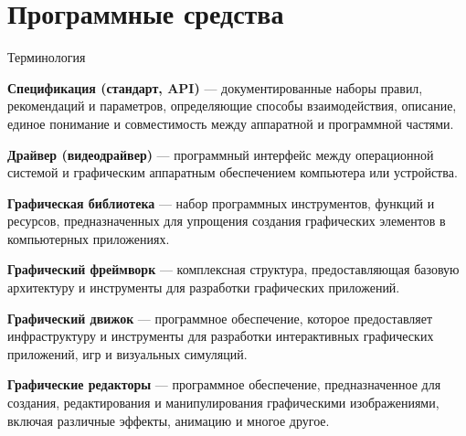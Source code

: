 \documentclass{beamer}
\begin{document}
\section{Программные средства}
\begin{frame}{Терминология}
	{\scriptsize

		\textbf{Спецификация (стандарт, API)} --- документированные наборы правил, рекомендаций и параметров, определяющие способы взаимодействия, описание, единое понимание и совместимость между аппаратной и программной частями.

		\textbf{Драйвер (видеодрайвер)} --- программный интерфейс между операционной системой и графическим аппаратным обеспечением компьютера или устройства.

		\textbf{Графическая библиотека} --- набор программных инструментов, функций и ресурсов, предназначенных для упрощения создания графических элементов в компьютерных приложениях.

		\textbf{Графический фреймворк} --- комплексная структура, предоставляющая базовую архитектуру и инструменты для разработки графических приложений.

		\textbf{Графический движок} --- программное обеспечение, которое предоставляет инфраструктуру и инструменты для разработки интерактивных графических приложений, игр и визуальных симуляций.

		\textbf{Графические редакторы} --- программное обеспечение, предназначенное для создания, редактирования и манипулирования графическими изображениями, включая различные эффекты, анимацию и многое другое.

}
\end{frame}
\end{document}
